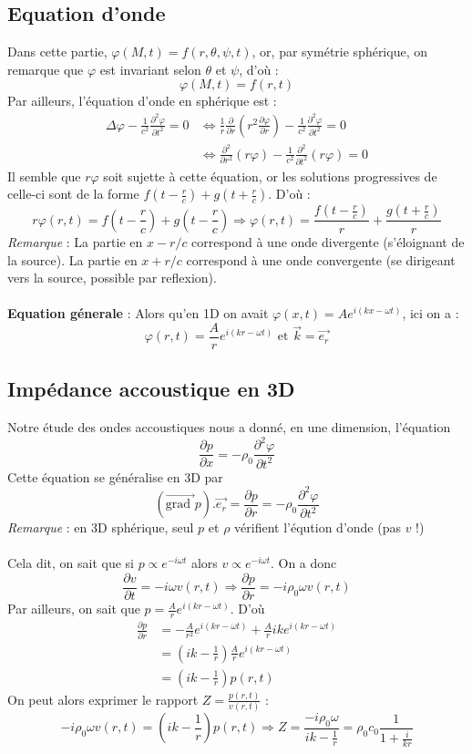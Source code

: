 \subsection{Equation d'onde}
Dans cette partie, $\varphi(M,t)=f(r,\theta,\psi,t)$, or, par symétrie sphérique, on remarque que $\varphi$ est invariant selon $\theta$ et $\psi$, d'où :
\[ \varphi(M,t)=f(r,t) \]
Par ailleurs, l'équation d'onde en sphérique est :
\[
\begin{array}{ll}
\Delta\varphi-\frac{1}{c^2}\frac{\partial^2\varphi}{\partial t^2}=0 &
\Leftrightarrow \frac{1}{r}\frac{\partial}{\partial r}\left(r^2\frac{\partial\varphi}{\partial r}\right)-\frac{1}{c^2}\frac{\partial^2\varphi}{\partial t^2}=0 \\
& \Leftrightarrow \frac{\partial^2}{\partial r^2}\left(r\varphi\right)-\frac{1}{c^2}\frac{\partial^2}{\partial t^2}\left(r\varphi\right)=0
\end{array}
\]
Il semble que $r\varphi$ soit sujette à cette équation, or les solutions progressives de celle-ci sont de la forme $f(t-\frac{r}{c})+g(t+\frac{r}{c})$. D'où :
\[
r\varphi(r,t)=f(t-\frac{r}{c})+g(t-\frac{r}{c}) \Rightarrow \varphi(r,t)=\frac{f(t-\frac{r}{c})}{r}+\frac{g(t+\frac{r}{c})}{r}
\]
\emph{Remarque} : La partie en $x-r/c$ correspond à une onde divergente (s'éloignant de la source). La partie en $x+r/c$ correspond à une onde convergente (se dirigeant vers la source, possible par reflexion).\\\\
\textbf{Equation génerale} : Alors qu'en 1D on avait $\varphi(x,t)=Ae^{i(kx-\omega t)}$, ici on a : 
\[\varphi(r,t)=\frac{A}{r}e^{i(kr-\omega t)} \textrm{ et } \vec{k}=\vec{e_r} \]

\subsection{Impédance accoustique en 3D}
Notre étude des ondes accoustiques nous a donné, en une dimension, l'équation 
\[ \frac{\partial p}{\partial x}=-\rho_0\frac{\partial^2\varphi}{\partial t^2} \]
Cette équation se généralise en 3D par
\[ (\vec{\textrm{grad }}p).\vec{e_r}=\frac{\partial p}{\partial r}=-\rho_0\frac{\partial^2\varphi}{\partial t^2} \]
\emph{Remarque} : en 3D sphérique, seul $p$ et $\rho$ vérifient l'éqution d'onde (pas $v$ !)\\\\
Cela dit, on sait que si $p\propto e^{-i\omega t}$ alors $v\propto e^{-i\omega t}$. On a donc 
\[ \frac{\partial v}{\partial t}=-i\omega v(r,t) \Rightarrow \frac{\partial p}{\partial r}=-i\rho_0\omega v(r,t) \]
Par ailleurs, on sait que $p=\frac{A}{r}e^{i(kr-\omega t)}$. D'où
\[ 
\begin{array}{ll}
\frac{\partial p}{\partial r} & = -\frac{A}{r^2}e^{i(kr-\omega t)}+\frac{A}{r}ike^{i(kr-\omega t)} \\
& = (ik-\frac{1}{r})\frac{A}{r}e^{i(kr-\omega t)} \\
& = (ik-\frac{1}{r})p(r,t)
\end{array}
\]
On peut alors exprimer le rapport $Z=\frac{p(r,t)}{v(r,t)}$ :
\[ 
-i\rho_0\omega v(r,t)=(ik-\frac{1}{r})p(r,t) \Rightarrow Z=\frac{-i\rho_0\omega}{ik-\frac{1}{r}}=\rho_0c_0\frac{1}{1+\frac{i}{kr}}
\]
